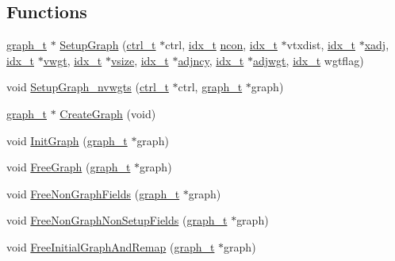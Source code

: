 \subsection*{Functions}
\begin{DoxyCompactItemize}
\item 
\hyperlink{a00734}{graph\+\_\+t} $\ast$ \hyperlink{a00852_a010e2ad3dd68ae816d481fdcd4260583}{Setup\+Graph} (\hyperlink{a00742}{ctrl\+\_\+t} $\ast$ctrl, \hyperlink{a00876_aaa5262be3e700770163401acb0150f52}{idx\+\_\+t} \hyperlink{a00879_ac1dd31740e8f97fb57dc917ded30253f}{ncon}, \hyperlink{a00876_aaa5262be3e700770163401acb0150f52}{idx\+\_\+t} $\ast$vtxdist, \hyperlink{a00876_aaa5262be3e700770163401acb0150f52}{idx\+\_\+t} $\ast$\hyperlink{a00879_aa8fc7f75458e38e1e2979ed6db639164}{xadj}, \hyperlink{a00876_aaa5262be3e700770163401acb0150f52}{idx\+\_\+t} $\ast$\hyperlink{a00879_a34203f1160d94eca83e95f2718ea3504}{vwgt}, \hyperlink{a00876_aaa5262be3e700770163401acb0150f52}{idx\+\_\+t} $\ast$\hyperlink{a00879_aac32df5bb22250d94fc2fc7e4078308b}{vsize}, \hyperlink{a00876_aaa5262be3e700770163401acb0150f52}{idx\+\_\+t} $\ast$\hyperlink{a00879_a20c068e3ebdd8f9889fb82c1f677d679}{adjncy}, \hyperlink{a00876_aaa5262be3e700770163401acb0150f52}{idx\+\_\+t} $\ast$\hyperlink{a00879_a2be4719baa820cfa5c06fd070796e0d3}{adjwgt}, \hyperlink{a00876_aaa5262be3e700770163401acb0150f52}{idx\+\_\+t} wgtflag)
\item 
void \hyperlink{a00852_adc4ae6f6575afd6ae777f535ea8c439f}{Setup\+Graph\+\_\+nvwgts} (\hyperlink{a00742}{ctrl\+\_\+t} $\ast$ctrl, \hyperlink{a00734}{graph\+\_\+t} $\ast$graph)
\item 
\hyperlink{a00734}{graph\+\_\+t} $\ast$ \hyperlink{a00852_a01903fa912de9fc7f01dace993a3fc85}{Create\+Graph} (void)
\item 
void \hyperlink{a00852_af046766ada304a0cf49db44b544810a8}{Init\+Graph} (\hyperlink{a00734}{graph\+\_\+t} $\ast$graph)
\item 
void \hyperlink{a00852_a583ba60fc42c1592f69587a1ae9c94d4}{Free\+Graph} (\hyperlink{a00734}{graph\+\_\+t} $\ast$graph)
\item 
void \hyperlink{a00852_a0ff13bda23f95ec19bb263ef036cd109}{Free\+Non\+Graph\+Fields} (\hyperlink{a00734}{graph\+\_\+t} $\ast$graph)
\item 
void \hyperlink{a00852_a7f1865a64a8a13def4eacf3d253f970a}{Free\+Non\+Graph\+Non\+Setup\+Fields} (\hyperlink{a00734}{graph\+\_\+t} $\ast$graph)
\item 
void \hyperlink{a00852_a739360f530677f48f239c049cbbf7855}{Free\+Initial\+Graph\+And\+Remap} (\hyperlink{a00734}{graph\+\_\+t} $\ast$graph)
\end{DoxyCompactItemize}


